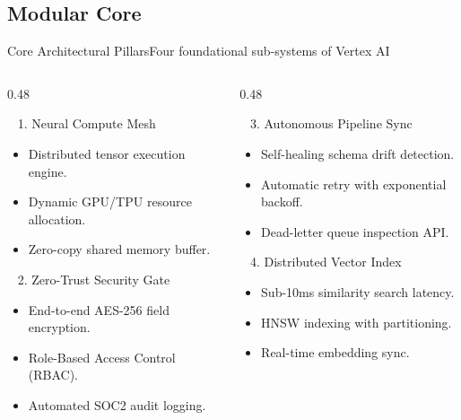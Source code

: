 \documentclass[aspectratio=169, 10pt]{beamer}
\newenvironment{compactitemize}{%
  \begin{itemize}%
    \setlength{\itemsep}{1pt}%
    \setlength{\parskip}{0pt}%
    \setlength{\parsep}{0pt}%
}{%
  \end{itemize}%
}
\begin{document}
\subsection{Modular Core}
\begin{frame}{Core Architectural Pillars}{Four foundational sub-systems of Vertex AI}
  \begin{columns}[T]
    \begin{column}{0.48\textwidth}
      \begin{featurebox}{\faMicrochip~ 1. Neural Compute Mesh}
        \tiny
        \begin{compactitemize}
          \item Distributed tensor execution engine.
          \item Dynamic GPU/TPU resource allocation.
          \item Zero-copy shared memory buffer.
        \end{compactitemize}
      \end{featurebox}
      \vspace*{2pt}
      \begin{featurebox}{\faLock~ 2. Zero-Trust Security Gate}
        \tiny
        \begin{compactitemize}
          \item End-to-end AES-256 field encryption.
          \item Role-Based Access Control (RBAC).
          \item Automated SOC2 audit logging.
        \end{compactitemize}
      \end{featurebox}
    \end{column}

    \begin{column}{0.48\textwidth}
      \begin{featurebox}{\faSync~ 3. Autonomous Pipeline Sync}
        \tiny
        \begin{compactitemize}
          \item Self-healing schema drift detection.
          \item Automatic retry with exponential backoff.
          \item Dead-letter queue inspection API.
        \end{compactitemize}
      \end{featurebox}
      \vspace*{2pt}
      \begin{featurebox}{\faNetworkWired~ 4. Distributed Vector Index}
        \tiny
        \begin{compactitemize}
          \item Sub-10ms similarity search latency.
          \item HNSW indexing with partitioning.
          \item Real-time embedding sync.
        \end{compactitemize}
      \end{featurebox}
    \end{column}
  \end{columns}
\end{frame}
\end{document}
